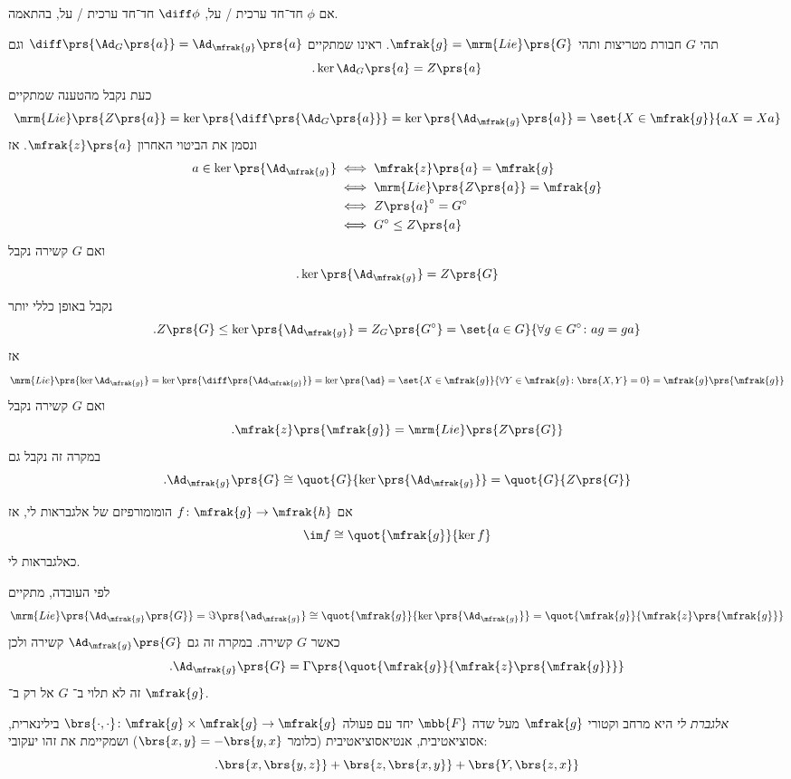 \documentclass[10pt, twoside]{book}
\newcommand{\Lie}{\mrm{Lie}}
\begin{document}
\begin{corollary}
אם
$\phi$
חד־חד ערכית / על,
$\diff \phi$
חד־חד ערכית / על, בהתאמה.
\end{corollary}

תהי
$G$
חבורת מטריצות ותהי
$\mfrak{g} = \Lie\prs{G}$.
ראינו שמתקיים
$\diff\prs{\Ad_G\prs{a}} = \Ad_{\mfrak{g}}\prs{a}$
וגם
\[\text{.}\ker \Ad_G\prs{a} = Z\prs{a}\]
כעת נקבל מהטענה שמתקיים
\[\Lie\prs{Z\prs{a}} = \ker\prs{\diff\prs{\Ad_G\prs{a}}} = \ker\prs{\Ad_{\mfrak{g}}\prs{a}} = \set{X \in \mfrak{g}}{aX = Xa}\]
ונסמן את הביטוי האחרון
$\mfrak{z}\prs{a}$.
אז
\begin{align*}
a \in \ker\prs{\Ad_\mfrak{g}} &\iff \mfrak{z}\prs{a} = \mfrak{g}
\\&\iff \Lie\prs{Z\prs{a}} = \mfrak{g}
\\&\iff Z\prs{a}^\circ = G^\circ
\\&\iff G^\circ \leq Z\prs{a}
\end{align*}
ואם
$G$
קשירה נקבל
\[\text{.} \ker\prs{\Ad_{\mfrak{g}}} = Z\prs{G}\]

נקבל באופן כללי יותר
\[\text{.} Z\prs{G} \leq \ker\prs{\Ad_{\mfrak{g}}} = Z_G\prs{G^\circ} = \set{a \in G}{\forall g \in G^\circ \colon ag = ga}\]
אז
\[\Lie\prs{\ker \Ad_{\mfrak{g}}} = \ker\prs{\diff\prs{\Ad_{\mfrak{g}}}} = \ker\prs{\ad} = \set{X \in \mfrak{g}}{\forall Y \in \mfrak{g} \colon \brs{X,Y} = 0} = \mfrak{g}\prs{\mfrak{g}}\]
ואם
$G$
קשירה נקבל
\[\text{.} \mfrak{z}\prs{\mfrak{g}} = \Lie\prs{Z\prs{G}}\]
במקרה זה נקבל גם
\[\text{.} \Ad_{\mfrak{g}}\prs{G} \cong \quot{G}{\ker\prs{\Ad_{\mfrak{g}}}} = \quot{G}{Z\prs{G}}\]

\begin{fact}
אם
$f \colon \mfrak{g} \to \mfrak{h}$
הומומורפיזם של אלגבראות לי, אז
\[\im f \cong \quot{\mfrak{g}}{\ker f}\]
כאלגבראות לי.
\end{fact}

לפי העובדה, מתקיים
\[\Lie\prs{\Ad_{\mfrak{g}}\prs{G}} = \Im \prs{\ad_{\mfrak{g}}} \cong \quot{\mfrak{g}}{\ker \prs{\Ad_{\mfrak{g}}}} = \quot{\mfrak{g}}{\mfrak{z}\prs{\mfrak{g}}}\]
כאשר
$G$
קשירה. במקרה זה גם
$\Ad_{\mfrak{g}}\prs{G}$
קשירה ולכן
\[\text{.} \Ad_{\mfrak{g}}\prs{G} = \Gamma\prs{\quot{\mfrak{g}}{\mfrak{z}\prs{\mfrak{g}}}}\]
זה לא תלוי ב־%
$G$
אל רק ב־%
$\mfrak{g}$.

\begin{definition}[אלגברת לי]
\emph{אלגברת לי}
היא מרחב וקטורי
$\mfrak{g}$
מעל שדה
$\mbb{F}$
יחד עם פעולה
$\brs{\cdot,\cdot} \colon \mfrak{g} \times \mfrak{g} \to \mfrak{g}$
בילינארית, אסוציאטיבית, אנטיאסוציאטיבית (כלומר $\brs{x,y} = -\brs{y,x}$) ושמקיימת את זהו יעקובי:
\[\text{.} \brs{x, \brs{y,z}} + \brs{z, \brs{x,y}} + \brs{Y,\brs{z,x}}\]
\end{definition}
\end{document}

